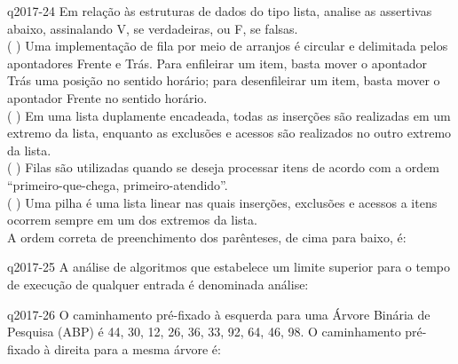 \documentclass[10pt,a4paper]{article}
\begin{document}
{
\def\AMCbeginQuestion#1#2{\par\noindent{\bf (POSCOMP 2017 - Questão 24)}}
\begin{question}{q2017-24} Em relação às estruturas de dados do tipo lista, analise as assertivas abaixo, assinalando V, se verdadeiras, ou F, se falsas.\\
( ) Uma implementação de fila por meio de arranjos é circular e delimitada pelos apontadores Frente e Trás. Para enfileirar um item, basta mover o apontador Trás uma posição no sentido horário; para desenfileirar um item, basta mover o apontador Frente no sentido horário.\\
( ) Em uma lista duplamente encadeada, todas as inserções são realizadas em um extremo da lista, enquanto as exclusões e acessos são realizados no outro extremo da lista.\\
( ) Filas são utilizadas quando se deseja processar itens de acordo com a ordem ``primeiro-que-chega, primeiro-atendido''.\\
( ) Uma pilha é uma lista linear nas quais inserções, exclusões e acessos a itens ocorrem sempre em um dos extremos da lista.\\
A ordem correta de preenchimento dos parênteses, de cima para baixo, é:
\begin{choices}
\end{choices}
\end{question}
}

{
\def\AMCbeginQuestion#1#2{\par\noindent{\bf (POSCOMP 2017 - Questão 25)}}
\begin{question}{q2017-25} A análise de algoritmos que estabelece um limite superior para o tempo de execução de qualquer entrada é denominada análise:
\begin{choices}
\end{choices}
\end{question}
}

{
\def\AMCbeginQuestion#1#2{\par\noindent{\bf (POSCOMP 2017 - Questão 26)}}
\begin{question}{q2017-26} O caminhamento pré-fixado à esquerda para uma Árvore Binária de Pesquisa (ABP) é 44, 30, 12, 26, 36, 33, 92, 64, 46, 98. O caminhamento pré-fixado à direita para a mesma árvore é:
\begin{choices}
\end{choices}
\end{question}
}
\end{document}

